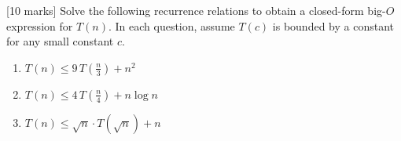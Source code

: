 {[10 marks]} Solve the following recurrence relations to obtain a closed-form big-$O$ expression for $T(n)$.
In each question, assume $T(c)$ is bounded by a constant for any small constant $c$.

\begin{enumerate}
    \item $T(n) \le 9\,T(\frac{n}{3}) + n^2$

    \item $T(n) \le 4\,T(\frac{n}{4}) + n \log n$

    \item $T(n) \le \sqrt{n} \cdot T(\sqrt{n}) + n$
\end{enumerate}